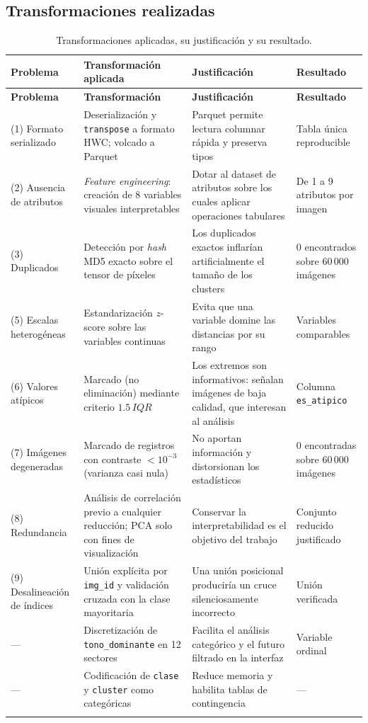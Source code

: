 \documentclass[11pt,a4paper]{article}
\begin{document}
\subsection{Transformaciones realizadas}

{\small
\begin{longtable}{@{}p{3.3cm}p{4.2cm}p{4.2cm}p{3.2cm}@{}}
\toprule
\textbf{Problema} & \textbf{Transformación aplicada} & \textbf{Justificación} & \textbf{Resultado} \\
\midrule
\endfirsthead
\toprule
\textbf{Problema} & \textbf{Transformación} & \textbf{Justificación} & \textbf{Resultado} \\
\midrule
\endhead
(1) Formato serializado & Deserialización y \texttt{transpose} a formato HWC; volcado a Parquet & Parquet permite lectura columnar rápida y preserva tipos & Tabla única reproducible \\
(2) Ausencia de atributos & \emph{Feature engineering}: creación de 8 variables visuales interpretables & Dotar al dataset de atributos sobre los cuales aplicar operaciones tabulares & De 1 a 9 atributos por imagen \\
(3) Duplicados & Detección por \emph{hash} MD5 exacto sobre el tensor de píxeles & Los duplicados exactos inflarían artificialmente el tamaño de los clusters & 0 encontrados sobre 60\,000 imágenes \\
(5) Escalas heterogéneas & Estandarización $z$-score sobre las variables continuas & Evita que una variable domine las distancias por su rango & Variables comparables \\
(6) Valores atípicos & Marcado (no eliminación) mediante criterio $1.5\,IQR$ & Los extremos son informativos: señalan imágenes de baja calidad, que interesan al análisis & Columna \texttt{es\_atipico} \\
(7) Imágenes degeneradas & Marcado de registros con contraste $<10^{-3}$ (varianza casi nula) & No aportan información y distorsionan los estadísticos & 0 encontradas sobre 60\,000 imágenes \\
(8) Redundancia & Análisis de correlación previo a cualquier reducción; PCA solo con fines de visualización & Conservar la interpretabilidad es el objetivo del trabajo & Conjunto reducido justificado \\
(9) Desalineación de índices & Unión explícita por \texttt{img\_id} y validación cruzada con la clase mayoritaria & Una unión posicional produciría un cruce silenciosamente incorrecto & Unión verificada \\
--- & Discretización de \texttt{tono\_dominante} en 12 sectores & Facilita el análisis categórico y el futuro filtrado en la interfaz & Variable ordinal \\
--- & Codificación de \texttt{clase} y \texttt{cluster} como categóricas & Reduce memoria y habilita tablas de contingencia & --- \\
\bottomrule
\caption{Transformaciones aplicadas, su justificación y su resultado.}
\label{tab:transformaciones}
\end{longtable}
}
\end{document}
